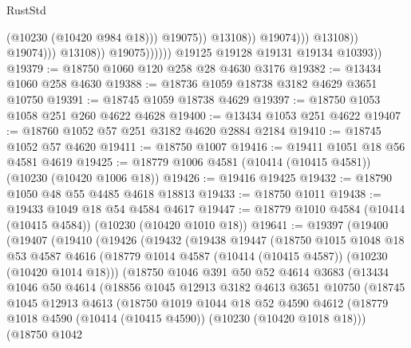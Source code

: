 \begin{lexlean}{RustStd}
\begin{coremodule}
                                                  (@10230 (@10420 @984 @18)))
                                                @19075))
                                            @13108))
                                        @19074)))
                                  @13108))
                              @19074)))
                        @13108))
                    @19075))))))
        @19125
        @19128
        @19131
        @19134
        @10393))
@19379 := @18750 @1060 @120 @258 @28 @4630 @3176
@19382 := @13434 @1060 @258 @4630
@19388 := @18736 @1059 @18738 @3182 @4629 @3651 @10750
@19391 := @18745 @1059 @18738 @4629
@19397 := @18750 @1053 @1058 @251 @260 @4622 @4628
@19400 := @13434 @1053 @251 @4622
@19407 := @18760 @1052 @57 @251 @3182 @4620 @2884 @2184
@19410 := @18745 @1052 @57 @4620
@19411 := @18750 @1007
@19416 := @19411 @1051 @18 @56 @4581 @4619
@19425 := @18779 @1006 @4581 (@10414 (@10415 @4581)) (@10230 (@10420 @1006 @18))
@19426 := @19416 @19425
@19432 := @18790 @1050 @48 @55 @4485 @4618 @18813
@19433 := @18750 @1011
@19438 := @19433 @1049 @18 @54 @4584 @4617
@19447 := @18779 @1010 @4584 (@10414 (@10415 @4584)) (@10230 (@10420 @1010 @18))
@19641 := @19397
    (@19400
      (@19407
        (@19410
          (@19426
            (@19432
              (@19438
                @19447
                (@18750
                  @1015
                  @1048
                  @18
                  @53
                  @4587
                  @4616
                  (@18779 @1014 @4587 (@10414 (@10415 @4587)) (@10230 (@10420 @1014 @18)))
                  (@18750
                    @1046
                    @391
                    @50
                    @52
                    @4614
                    @3683
                    (@13434
                      @1046
                      @50
                      @4614
                      (@18856
                        @1045
                        @12913
                        @3182
                        @4613
                        @3651
                        @10750
                        (@18745
                          @1045
                          @12913
                          @4613
                          (@18750
                            @1019
                            @1044
                            @18
                            @52
                            @4590
                            @4612
                            (@18779 @1018 @4590 (@10414 (@10415 @4590)) (@10230 (@10420 @1018 @18)))
                            (@18750
                              @1042

\end{coremodule}
\end{lexlean}
